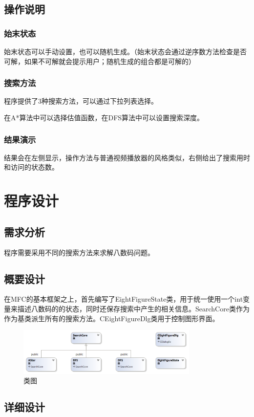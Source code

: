 \documentclass[12pt,a4paper]{article}
\begin{document}
\subsection{操作说明}
\subsubsection{始末状态}
始末状态可以手动设置，也可以随机生成。（始末状态会通过逆序数方法检查是否可解，如果不可解就会提示用户；随机生成的组合都是可解的）
\subsubsection{搜索方法}
程序提供了3种搜索方法，可以通过下拉列表选择。\par
在A*算法中可以选择估值函数，在DFS算法中可以设置搜索深度。
\subsubsection{结果演示}
结果会在左侧显示，操作方法与普通视频播放器的风格类似，右侧给出了搜索用时和访问的状态数。
\section{程序设计}
\subsection{需求分析}
程序需要采用不同的搜索方法来求解八数码问题。
\subsection{概要设计}
在MFC的基本框架之上，首先编写了EightFigureState类，用于统一使用一个int变量来描述八数码的的状态，同时还保存搜索中产生的相关信息。SearchCore类作为作为基类派生所有的搜索方法。CEightFigureDlg类用于控制图形界面。
\begin{figure}[H]
\centering
\includegraphics[width=0.8\textwidth]{3.png}
\caption{类图} 
\end{figure}
\subsection{详细设计}
\end{document}
